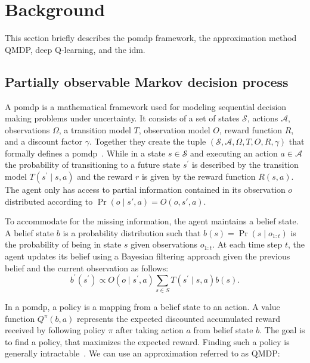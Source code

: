 


\section{Background}
\label{sec:background}
This section briefly describes the \gls{pomdp} framework, the approximation method QMDP, deep Q-learning, and the \gls{idm}.  


\subsection{Partially observable Markov decision process}
A \gls{pomdp} is a mathematical framework used for modeling sequential decision making problems under uncertainty. 
It consists of a set of states $\mathcal{S}$, actions $\mathcal{A}$, observations $\Omega$, a transition model $T$, observation model $O$, reward function $R$, and a discount factor $\gamma$. 
Together they create the tuple $(\mathcal{S},\mathcal{A},\Omega,T,O,R,\gamma)$ that formally defines a \gls{pomdp}~\cite{Kochenderfer2015}. 
While in a state $s \in \mathcal{S}$ and executing an action $a \in \mathcal{A}$ the probability of transitioning to a future state $s^\prime$ is described by the transition model $T(s^\prime \mid s,a)$ and the reward $r$ is given by the reward function $R(s,a)$. 
The agent only has access to partial information contained in its observation $o$ distributed according to $\Pr(o \mid s', a) = O(o, s', a)$.

To accommodate for the missing information, the agent maintains a belief state. A belief state $b$ is a probability distribution such that $b(s) = \Pr(s \mid o_{1:t})$ is the probability of being in state $s$ given observations $o_{1:t}$. 
At each time step $t$, the agent updates its belief using a Bayesian filtering approach given the previous belief and the current observation as follows:
\begin{equation}
    b^\prime(s^\prime) \propto O(o \mid s^\prime, a) \sum_{s \in S}T(s^\prime \mid s,a)b(s).
\end{equation}

In a \gls{pomdp}, a policy is a mapping from a belief state to an action. A value function $Q^\pi(b, a)$ represents the expected discounted accumulated reward received by following policy $\pi$ after taking action $a$ from belief state $b$.
The goal is to find a policy, that maximizes the expected reward.
Finding such a policy is generally intractable~\cite{Kochenderfer2015}. We can use an approximation referred to as QMDP:


